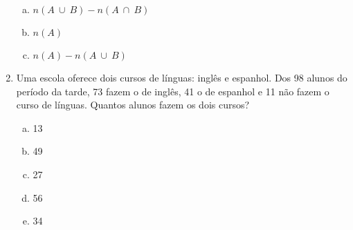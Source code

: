 \documentclass[a4paper,14pt]{article}
\begin{document}
\begin{multicols}{2}
\begin{enumerate}
\begin{enumerate}[a)]
    		\item $n(A~\cup~B) - n(A~\cap~B)$
    		\item $n(A)$
    		\item $n(A) - n(A~\cup~B)$
    	\end{enumerate}
    	\item Uma escola oferece dois cursos de línguas: inglês e espanhol. Dos 98 alunos do período da tarde, 73 fazem o de inglês, 41 o de espanhol e 11 não fazem o curso de línguas. Quantos alunos fazem os dois cursos?
    	\begin{enumerate}[a)]
    		\item 13
    		\item 49
    		\item 27
    		\item 56
    		\item 34
    	\end{enumerate}
    \end{enumerate}
$~$ \\ $~$ \\ $~$ \\ $~$ \\ $~$ \\ $~$ \\ $~$ \\ $~$ \\ $~$ \\ $~$ \\ $~$ \\ $~$ \\ $~$ \\ $~$ \\ $~$ \\ $~$ \\ $~$ \\ $~$ \\ $~$ \\ $~$ \\ $~$ \\ $~$ \\ $~$ \\ $~$ \\ $~$ \\ $~$ \\ $~$ \\ 
	\end{multicols}
\end{document}
